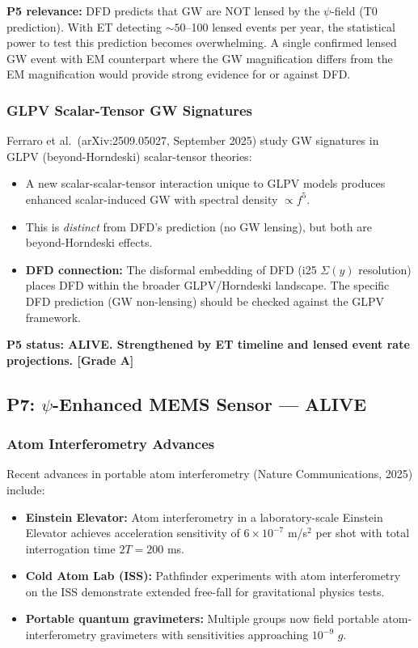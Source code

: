 \documentclass[11pt]{article}
\newcommand{\ee}[1]{\times 10^{#1}}
\begin{document}
\textbf{P5 relevance:} DFD predicts that GW are NOT lensed by the
$\psi$-field (T0 prediction). With ET detecting $\sim 50$--100 lensed
events per year, the statistical power to test this prediction becomes
overwhelming. A single confirmed lensed GW event with EM counterpart
where the GW magnification differs from the EM magnification would
provide strong evidence for or against DFD.

\subsubsection{GLPV Scalar-Tensor GW Signatures}

Ferraro et al.\ (arXiv:2509.05027, September 2025) study GW
signatures in GLPV (beyond-Horndeski) scalar-tensor theories:
\begin{itemize}
  \item A new scalar-scalar-tensor interaction unique to GLPV models
    produces enhanced scalar-induced GW with spectral density
    $\propto f^5$.
  \item This is \emph{distinct} from DFD's prediction (no GW lensing),
    but both are beyond-Horndeski effects.
  \item \textbf{DFD connection:} The disformal embedding of DFD
    (i25 $\Sigma(y)$ resolution) places DFD within the broader
    GLPV/Horndeski landscape. The specific DFD prediction (GW non-lensing)
    should be checked against the GLPV framework.
\end{itemize}

\textbf{P5 status: ALIVE. Strengthened by ET timeline and lensed
event rate projections. [Grade A]}

\subsection{P7: $\psi$-Enhanced MEMS Sensor --- ALIVE}

\subsubsection{Atom Interferometry Advances}

Recent advances in portable atom interferometry (Nature Communications,
2025) include:
\begin{itemize}
  \item \textbf{Einstein Elevator:} Atom interferometry in a
    laboratory-scale Einstein Elevator achieves acceleration
    sensitivity of $6\ee{-7}$ m/s$^2$ per shot with total
    interrogation time $2T = 200$ ms.
  \item \textbf{Cold Atom Lab (ISS):} Pathfinder experiments with
    atom interferometry on the ISS demonstrate extended free-fall
    for gravitational physics tests.
  \item \textbf{Portable quantum gravimeters:} Multiple groups now
    field portable atom-interferometry gravimeters with sensitivities
    approaching $10^{-9}$ $g$.
\end{itemize}
\end{document}
